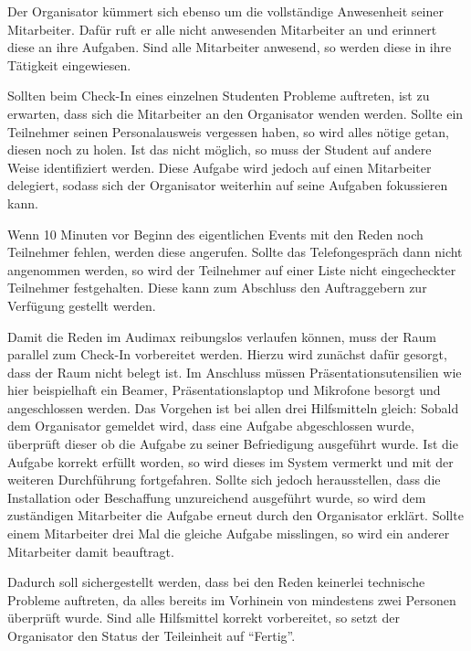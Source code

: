 Der Organisator kümmert sich ebenso um die vollständige Anwesenheit seiner Mitarbeiter. Dafür ruft er alle nicht anwesenden Mitarbeiter an und erinnert diese an ihre Aufgaben. Sind alle Mitarbeiter anwesend, so werden diese in ihre Tätigkeit eingewiesen.

Sollten beim Check-In eines einzelnen Studenten Probleme auftreten, ist zu erwarten, dass sich die Mitarbeiter an den Organisator wenden werden. Sollte ein Teilnehmer seinen Personalausweis vergessen haben, so wird alles nötige getan, diesen noch zu holen. Ist das nicht möglich, so muss der Student auf andere Weise identifiziert werden. Diese Aufgabe wird jedoch auf einen Mitarbeiter delegiert, sodass sich der Organisator weiterhin auf seine Aufgaben fokussieren kann.

Wenn 10 Minuten vor Beginn des eigentlichen Events mit den Reden noch Teilnehmer fehlen, werden diese angerufen. Sollte das Telefongespräch dann nicht angenommen werden, so wird der Teilnehmer auf einer Liste nicht eingecheckter Teilnehmer festgehalten. Diese kann zum Abschluss den Auftraggebern zur Verfügung gestellt werden.



Damit die Reden im Audimax reibungslos verlaufen können, muss der Raum parallel zum Check-In vorbereitet werden. Hierzu wird zunächst dafür gesorgt, dass der Raum nicht belegt ist. Im Anschluss müssen Präsentationsutensilien wie hier beispielhaft ein Beamer, Präsentationslaptop und Mikrofone besorgt und angeschlossen werden. Das Vorgehen ist bei allen drei Hilfsmitteln gleich: Sobald dem Organisator gemeldet wird, dass eine Aufgabe abgeschlossen wurde, überprüft dieser ob die Aufgabe zu seiner Befriedigung ausgeführt wurde. Ist die Aufgabe korrekt erfüllt worden, so wird dieses im System vermerkt und mit der weiteren Durchführung fortgefahren. Sollte sich jedoch herausstellen, dass die Installation oder Beschaffung unzureichend ausgeführt wurde, so wird dem zuständigen Mitarbeiter die Aufgabe erneut durch den Organisator erklärt. Sollte einem Mitarbeiter drei Mal die gleiche Aufgabe misslingen, so wird ein anderer Mitarbeiter damit beauftragt.

Dadurch soll sichergestellt werden, dass bei den Reden keinerlei technische Probleme auftreten, da alles bereits im Vorhinein von mindestens zwei Personen überprüft wurde. Sind alle Hilfsmittel korrekt vorbereitet, so setzt der Organisator den Status der Teileinheit auf \enquote{Fertig}.

